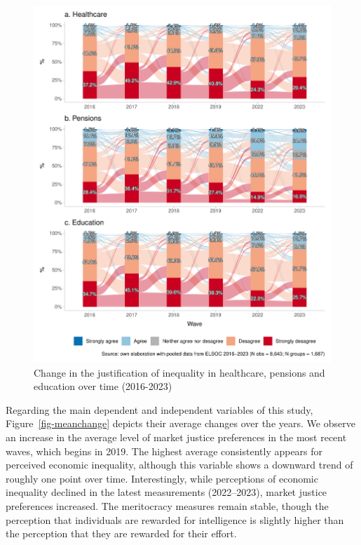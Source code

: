 \documentclass[
  12pt,
]{article}
\begin{document}
\begin{figure}[H]

{\centering \includegraphics[width=1\textwidth,height=\textheight]{paper_files/figure-pdf/fig-alluvial-1.pdf}

}

\caption{\label{fig-alluvial}Change in the justification of inequality
in healthcare, pensions and education over time (2016-2023)}

\end{figure}

Regarding the main dependent and independent variables of this study,
Figure~\ref{fig-meanchange} depicts their average changes over the
years. We observe an increase in the average level of market justice
preferences in the most recent waves, which begins in 2019. The highest
average consistently appears for perceived economic inequality, although
this variable shows a downward trend of roughly one point over time.
Interestingly, while perceptions of economic inequality declined in the
latest measurements (2022--2023), market justice preferences increased.
The meritocracy measures remain stable, though the perception that
individuals are rewarded for intelligence is slightly higher than the
perception that they are rewarded for their effort.
\end{document}
